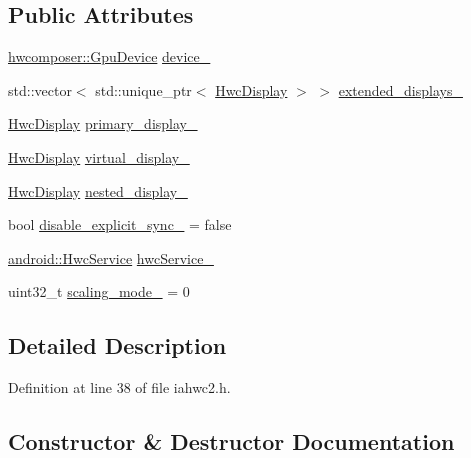 \subsection*{Public Attributes}
\begin{DoxyCompactItemize}
\item 
\mbox{\hyperlink{classhwcomposer_1_1GpuDevice}{hwcomposer\+::\+Gpu\+Device}} \mbox{\hyperlink{classandroid_1_1IAHWC2_ac20faf581346c9dace9127e3681a0666}{device\+\_\+}}
\item 
std\+::vector$<$ std\+::unique\+\_\+ptr$<$ \mbox{\hyperlink{classandroid_1_1IAHWC2_1_1HwcDisplay}{Hwc\+Display}} $>$ $>$ \mbox{\hyperlink{classandroid_1_1IAHWC2_a898debffb7438ad1174b7424ba99972c}{extended\+\_\+displays\+\_\+}}
\item 
\mbox{\hyperlink{classandroid_1_1IAHWC2_1_1HwcDisplay}{Hwc\+Display}} \mbox{\hyperlink{classandroid_1_1IAHWC2_ab6fc4580e0296ab10ecae375ced67e4c}{primary\+\_\+display\+\_\+}}
\item 
\mbox{\hyperlink{classandroid_1_1IAHWC2_1_1HwcDisplay}{Hwc\+Display}} \mbox{\hyperlink{classandroid_1_1IAHWC2_a37e11529251134e7fcb74d72330f1d43}{virtual\+\_\+display\+\_\+}}
\item 
\mbox{\hyperlink{classandroid_1_1IAHWC2_1_1HwcDisplay}{Hwc\+Display}} \mbox{\hyperlink{classandroid_1_1IAHWC2_a63c04984ca69519a5c094f9a8f66841c}{nested\+\_\+display\+\_\+}}
\item 
bool \mbox{\hyperlink{classandroid_1_1IAHWC2_adc8645c0a2315d4884f26f886002096e}{disable\+\_\+explicit\+\_\+sync\+\_\+}} = false
\item 
\mbox{\hyperlink{classandroid_1_1HwcService}{android\+::\+Hwc\+Service}} \mbox{\hyperlink{classandroid_1_1IAHWC2_aeacec4376e02e5c5da31fa7ed3986ce2}{hwc\+Service\+\_\+}}
\item 
uint32\+\_\+t \mbox{\hyperlink{classandroid_1_1IAHWC2_a7bcc5119aa74196920162eb37790fafc}{scaling\+\_\+mode\+\_\+}} = 0
\end{DoxyCompactItemize}


\subsection{Detailed Description}


Definition at line 38 of file iahwc2.\+h.



\subsection{Constructor \& Destructor Documentation}
\mbox{\label{classandroid_1_1IAHWC2_ae360eef66e03be710114293b9988c8a4}} 

